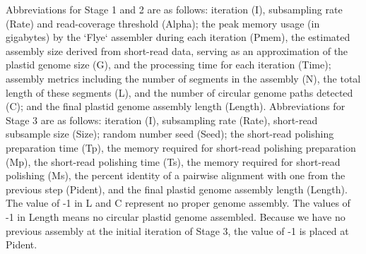 \begingroup
\scriptsize
\setlength{\parskip}{2pt}

Abbreviations for Stage 1 and 2 are as follows: 
iteration (I), subsampling rate (Rate) and read-coverage threshold (Alpha);
the peak memory usage (in gigabytes) by the `Flye` assembler during each iteration (Pmem),
the estimated assembly size derived from short-read data, serving as an approximation of the plastid genome size (G), and
the processing time for each iteration (Time);
assembly metrics including the number of segments in the assembly (N),
the total length of these segments (L), and
the number of circular genome paths detected (C); and
the final plastid genome assembly length (Length).
Abbreviations for Stage 3 are as follows: 
iteration (I), subsampling rate (Rate), short-read subsample size (Size);
random number seed (Seed);
the short-read polishing preparation time (Tp),
the memory required for short-read polishing preparation (Mp),
the short-read polishing time (Ts),
the memory required for short-read polishing (Ms),
the percent identity of a pairwise alignment with one from the previous step (Pident), and
the final plastid genome assembly length (Length).
The value of -1 in L and C represent no proper genome assembly.
The values of -1 in Length means no circular plastid genome assembled.
Because we have no previous assembly at the initial iteration of Stage 3,
the value of -1 is placed at Pident.

\endgroup

